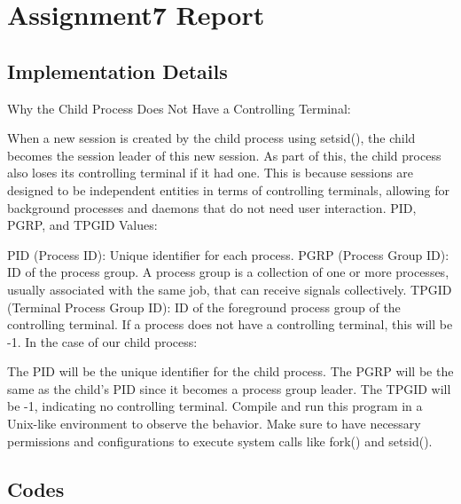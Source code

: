 \chapter{Assignment7 Report}


\section{Implementation Details}

Why the Child Process Does Not Have a Controlling Terminal:

When a new session is created by the child process using setsid(), the child becomes the session leader of this new session. As part of this, the child process also loses its controlling terminal if it had one. This is because sessions are designed to be independent entities in terms of controlling terminals, allowing for background processes and daemons that do not need user interaction.
PID, PGRP, and TPGID Values:

PID (Process ID): Unique identifier for each process.
PGRP (Process Group ID): ID of the process group. A process group is a collection of one or more processes, usually associated with the same job, that can receive signals collectively.
TPGID (Terminal Process Group ID): ID of the foreground process group of the controlling terminal. If a process does not have a controlling terminal, this will be -1.
In the case of our child process:

The PID will be the unique identifier for the child process.
The PGRP will be the same as the child's PID since it becomes a process group leader.
The TPGID will be -1, indicating no controlling terminal.
Compile and run this program in a Unix-like environment to observe the behavior. Make sure to have necessary permissions and configurations to execute system calls like fork() and setsid().

\newpage


\section{Codes}

\newpage


\newpage

